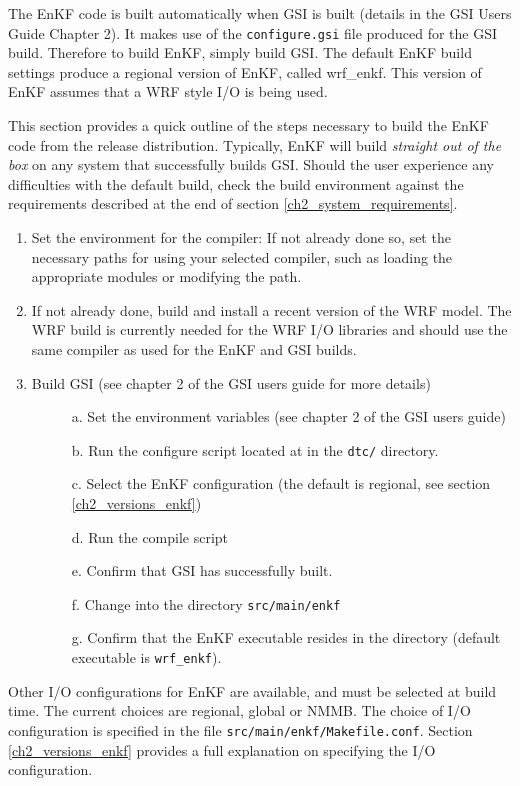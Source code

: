 The EnKF code is built automatically when GSI is built (details in the GSI User\textquotesingle s Guide Chapter 2). It makes use of the \verb|configure.gsi| file produced 
for the GSI build. Therefore to build EnKF, simply build GSI.  The default EnKF build settings produce a regional 
version of EnKF, called wrf\_enkf. This version of EnKF assumes that a WRF style I/O is being used. 

This section provides a quick outline of the steps necessary to build the EnKF code from the release distribution.
Typically, EnKF will build \textit{straight out of the box} on any system that successfully builds GSI. Should the user experience any difficulties with the default build, check the build environment against the requirements described at the end of section \ref{ch2_system_requirements}.
\begin{enumerate}
\item Set the environment for the compiler: If not already done so, set the necessary paths for using your selected compiler, such as loading the appropriate modules or modifying the path.
\item If not already done, build and install a recent version of the WRF model. The WRF build is currently needed for the WRF I/O libraries and should use the same compiler as used for the EnKF and GSI builds.
\item Build GSI (see chapter 2 of the GSI users guide for more details)
\begin{description}
\item[ ]a. Set the environment variables (see chapter 2 of the GSI users guide)
\item[ ]b. Run the configure script located at in the \verb|dtc/| directory.
\item[ ]c. Select the EnKF configuration (the default is regional, see section \ref{ch2_versions_enkf})
\item[ ]d. Run the compile script
\item[ ]e. Confirm that GSI has successfully built.
\item[ ]f. Change into the directory \verb|src/main/enkf|
\item[ ]g. Confirm that the EnKF executable resides in the directory  (default executable is \verb|wrf_enkf|).
\end{description}
\end{enumerate}

Other I/O configurations for EnKF are available, and must be selected at build time. The current choices are regional, global or NMMB. The choice of I/O configuration is specified in the file \verb|src/main/enkf/Makefile.conf|. Section \ref{ch2_versions_enkf} provides a full explanation on specifying the I/O configuration.

